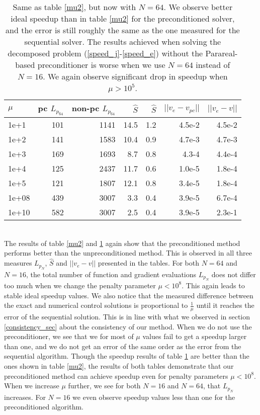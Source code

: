 \begin{table}[h]
\centering
\caption{Same as table \ref{mu2}, but now with $N=64$. We observe better ideal speedup than in table \ref{mu2} for the preconditioned solver, and the error is still roughly the same as the one measured for the sequential solver. The results achieved when solving the decomposed problem (\ref{speed_j}-\ref{speed_e}) without the Parareal-based preconditioner is worse when we use $N=64$ instead of $N=16$. We again observe significant drop in speedup when $\mu>10^5$.}
\label{mu3}
\begin{tabular}{lrrrrrr}
\toprule
{} $\mu$&    pc $L_{p_{64}}$ & non-pc $L_{p_{64}}$    &  $\hat S$ & $\hat S$ &  $||v_e-v_{pc}||$ &      $||v_e-v||$\\
\midrule
1e+1  &  101 &  1141 &  14.5 &  1.2 &  4.5e-2 &  4.5e-2 \\
1e+2   &  141 &  1583 &  10.4 &  0.9 &  4.7e-3 &  4.7e-3 \\
1e+3   &  169 &  1693 &   8.7 &  0.8 &  4.3-4 &  4.4e-4 \\
1e+4  &  125 &  2437 &  11.7 &  0.6 &  1.0e-5 &  1.8e-4 \\
1e+5 &  121 &  1807 &  12.1 &  0.8 &  3.4e-5 &  1.8e-4 \\
1e+08 &  439 &  3007 &   3.3 &  0.4 &  3.9e-5 &  6.7e-4 \\
1e+10 &  582 &  3007 &   2.5 &  0.4 &  3.9e-5 &  2.3e-1 \\
\bottomrule
\end{tabular}
\end{table}
\\
The results of table \ref{mu2} and \ref{mu3} again show that the preconditioned method performs better than the unpreconditioned method. This is observed in all three measures $L_{p_N}$, $\hat S$ and $||v_e-v||$ presented in the tables. For both $N=64$ and $N=16$, the total number of function and gradient evaluations $L_{p_N}$ does not differ too much when we change the penalty parameter $\mu<10^8$. This again leads to stable ideal speedup values. We also notice that the measured difference between the exact and numerical control solutions is proportional to $\frac{1}{\mu}$ until it reaches the error of the sequential solution. This is in line with what we observed in section \ref{consistency_sec} about the consistency of our method. When we do not use the preconditioner, we see that we for most of $\mu$ values fail to get a speedup larger than one, and we do not get an error of the same order as the error from the sequential algorithm. Though the speedup results of table \ref{mu3} are better than the ones shown in table \ref{mu2}, the results of both tables demonstrate that our preconditioned method can achieve speedup even for penalty parameters $\mu<10^8$. When we increase $\mu$ further, we see for both $N=16$ and $N=64$, that $L_{p_N}$ increases. For $N=16$ we even observe speedup values less than one for the preconditioned algorithm. 
